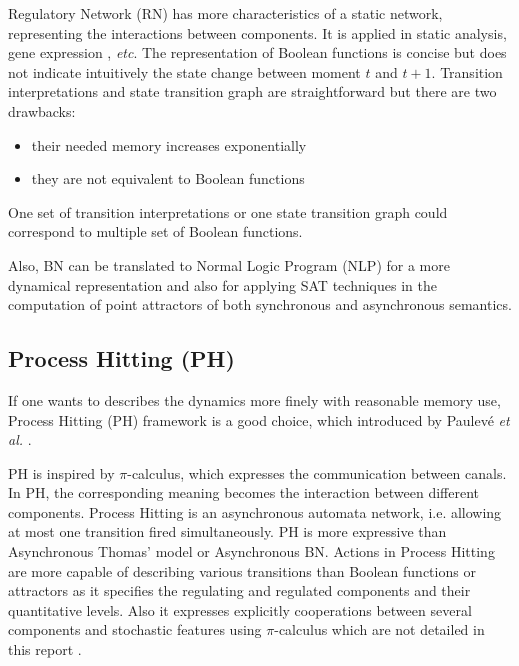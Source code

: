 Regulatory Network (RN) has more characteristics of a static network, representing the interactions between components. It is applied in static analysis, gene expression \cite{shinozaki2003regulatory}, \textit{etc}.
The representation of Boolean functions is concise but does not indicate intuitively the state change between moment $t$ and $t+1$.
Transition interpretations and state transition graph are straightforward but there are two drawbacks: 
\begin{itemize}
    \item their needed memory increases exponentially
    \item they are not equivalent to Boolean functions
\end{itemize}
One set of transition interpretations or one state transition graph could correspond to multiple set of Boolean functions.

Also, BN can be translated to Normal Logic Program (NLP) \cite{inoue2011logic} for a more dynamical representation and also for applying SAT techniques in the computation of point attractors of both synchronous and asynchronous semantics.


\subsection{Process Hitting (PH)}
If one wants to describes the dynamics more finely with reasonable memory use, Process Hitting (PH) framework is a good choice, which introduced by Paulev\'e \textit{et al.} \cite{pauleve2011}.

PH is inspired by $\pi$-calculus, which expresses the communication between canals. 
In PH, the corresponding meaning becomes the interaction between different components.
Process Hitting is an asynchronous automata network, i.e. allowing at most one transition fired simultaneously. 
PH is more expressive than Asynchronous Thomas' model \cite{thomas1978} or Asynchronous BN. 
Actions in Process Hitting are more capable of describing various transitions than Boolean functions or attractors as it specifies the regulating and regulated components and their quantitative levels.
Also it expresses explicitly cooperations between several components and stochastic features using $\pi$-calculus which are not detailed in this report \cite{pauleve2014}.

